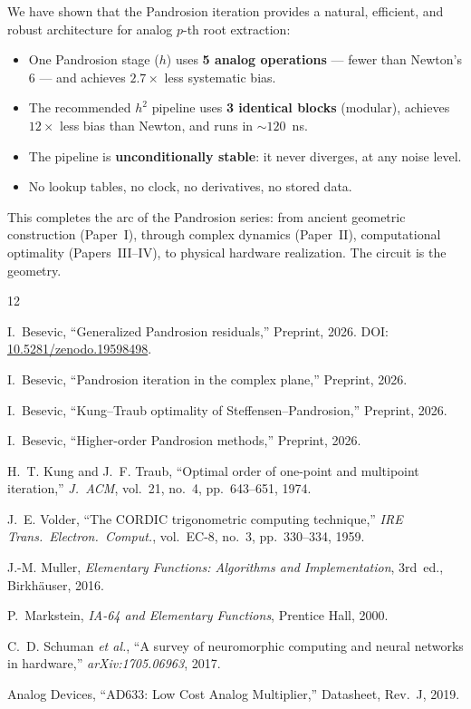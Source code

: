 \documentclass[11pt,a4paper]{article}
\theoremstyle{definition}
\begin{document}
We have shown that the Pandrosion iteration provides a natural, efficient, and robust architecture for analog $p$-th root extraction:

\begin{itemize}
  \item One Pandrosion stage ($h$) uses \textbf{5 analog operations} --- fewer than Newton's 6 --- and achieves $2.7\times$ less systematic bias.
  \item The recommended $h^2$ pipeline uses \textbf{3 identical blocks} (modular), achieves $12\times$ less bias than Newton, and runs in $\sim 120$~ns.
  \item The pipeline is \textbf{unconditionally stable}: it never diverges, at any noise level.
  \item No lookup tables, no clock, no derivatives, no stored data.
\end{itemize}

This completes the arc of the Pandrosion series: from ancient geometric construction (Paper~I), through complex dynamics (Paper~II), computational optimality (Papers~III--IV), to physical hardware realization.  The circuit is the geometry.

\begin{thebibliography}{12}

I.~Besevic,
``Generalized Pandrosion residuals,''
Preprint, 2026.
DOI: \href{https://doi.org/10.5281/zenodo.19598498}{10.5281/zenodo.19598498}.

I.~Besevic,
``Pandrosion iteration in the complex plane,''
Preprint, 2026.

I.~Besevic,
``Kung--Traub optimality of Steffensen--Pandrosion,''
Preprint, 2026.

I.~Besevic,
``Higher-order Pandrosion methods,''
Preprint, 2026.

H.~T. Kung and J.~F. Traub,
``Optimal order of one-point and multipoint iteration,''
\textit{J.~ACM}, vol.~21, no.~4, pp.~643--651, 1974.

J.~E. Volder,
``The CORDIC trigonometric computing technique,''
\textit{IRE Trans.\ Electron.\ Comput.}, vol.~EC-8, no.~3, pp.~330--334, 1959.

J.-M. Muller,
\textit{Elementary Functions: Algorithms and Implementation},
3rd~ed., Birkh\"{a}user, 2016.

P.~Markstein,
\textit{IA-64 and Elementary Functions},
Prentice Hall, 2000.

C.~D. Schuman \emph{et al.},
``A survey of neuromorphic computing and neural networks in hardware,''
\textit{arXiv:1705.06963}, 2017.

Analog Devices,
``AD633: Low Cost Analog Multiplier,''
Datasheet, Rev.~J, 2019.

\end{thebibliography}
\end{document}
